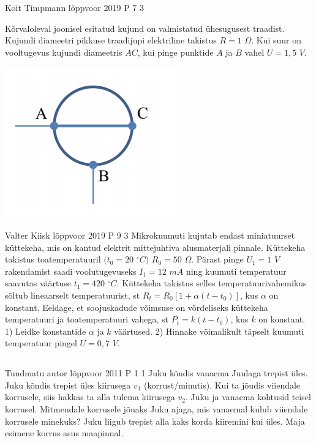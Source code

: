 \documentclass[11pt]{article}
\begin{document}
{%
{Koit Timpmann} %
{lõppvoor} %
{2019} %
{P 7} %
{3} %
{
\ifStatement
Kõrvaloleval joonisel esitatud kujund on valmistatud ühesugusest traadist. Kujundi diameetri pikkuse traadijupi elektriline takistus $R = 1$ $\Omega$. Kui suur on vooltugevus kujundi diameetris $AC$, kui pinge punktide $A$ ja $B$ vahel $U = 1,5$ $V$. 
\begin{center}
	\includegraphics[width=0.5\linewidth]{2019-v3p-07-yl.png}
\end{center}
\fi
}

{Valter Kiisk} %
{lõppvoor} %
{2019} %
{P 9} %
{3} %
{
\ifStatement
Mikrokuumuti kujutab endast miniatuurset küttekeha, mis on kantud elektrit mittejuhtiva alusmaterjali pinnale. Küttekeha takistus toatemperatuuril $(t_0 = 20$ $^{\circ}C)$ $R_0 = 50$ $\Omega$. Pärast pinge $U_1 = 1$ $V$ rakendamist saadi voolutugevuseks $I_1 = 12$ $mA$ ning kuumuti temperatuur saavutas väärtuse $t_1 = 420$ $^{\circ}C$. Küttekeha takistus selles temperatuurivahemikus sõltub lineaarselt temperatuurist, st $R_t = R_0 [1 + \alpha (t - t_0)]$, kus $\alpha$ on konstant. Eeldage, et soojuskadude võimsuse on võrdeliseks küttekeha temperatuuri ja toatemperatuuri vahega, st $P_t = k(t - t_0)$, kus $k$ on konstant. 
1) Leidke konstantide $\alpha$ ja $k$ väärtused. 
2) Hinnake võimalikult täpselt kuumuti temperatuur pingel $U = 0,7$ $V$.
\fi
}
\newpage\subsection{\protect{}}

{Tundmatu autor} %
{lõppvoor} %
{2011} %
{P 1} %
{1} %
{
\ifStatement
Juku kõndis vanaema Juulaga trepist üles. Juku kõndis trepist üles kiirusega $v_1$ (korrust/minutis). Kui ta jõudis viiendale korrusele, siis hakkas ta alla tulema kiirusega $v_2$. Juku ja vanaema kohtusid teisel korrusel. Mitmendale korrusele jõuaks Juku ajaga, mis vanaemal kulub viiendale korrusele minekuks? Juku liigub trepist alla kaks korda kiiremini kui üles. Maja esimene korrus asus maapinnal.
\fi
}


}
\end{document}
